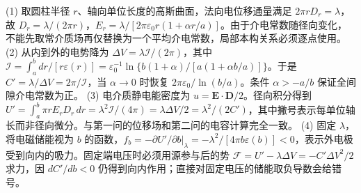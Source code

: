(1) 取圆柱半径 \(r\)、轴向单位长度的高斯曲面，法向电位移通量满足 \(2\pi rD_r=\lambda\)，故 \(D_r=\lambda/(2\pi r)\)，\(E_r=\lambda/[2\pi\varepsilon_0r(1+\alpha r/a)]\)。由于介电常数随径向变化，不能先取常介质场再仅替换为一个平均介电常数，局部本构关系必须逐点使用。
(2) 从内到外的电势降为 \(\Delta V=\lambda\mathcal I/(2\pi)\)，其中 \(\mathcal I=\int_a^b dr/[r\varepsilon(r)]=\varepsilon_0^{-1}\ln\{b(1+\alpha)/[a(1+\alpha b/a)]\}\)。于是 \(C'=\lambda/\Delta V=2\pi/\mathcal I\)，当 \(\alpha\to0\) 时恢复 \(2\pi\varepsilon_0/\ln(b/a)\)。条件 \(\alpha>-a/b\) 保证全间隙介电常数为正。
(3) 电介质静电能密度为 \(u=\boldsymbol E\cdot\boldsymbol D/2\)。径向积分得到 \(U'=\int_a^b \pi rE_rD_r\,dr=\lambda^2\mathcal I/(4\pi)=\lambda\Delta V/2=\lambda^2/(2C')\)，其中撇号表示每单位轴长而非径向微分。与第一问的位移场和第二问的电容计算完全一致。
(4) 固定 \(\lambda\)，将电磁储能视为 \(b\) 的函数，\(f_b=-\partial U'/\partial b|_\lambda=-\lambda^2/[4\pi b\varepsilon(b)]<0\)，表示外电极受到向内的吸力。固定端电压时必须用源参与后的势 \(\mathcal F=U'-\lambda\Delta V=-C'\Delta V^2/2\) 求力，因 \(dC'/db<0\) 仍得到向内作用；直接对固定电压的储能取负导数会给错号。
